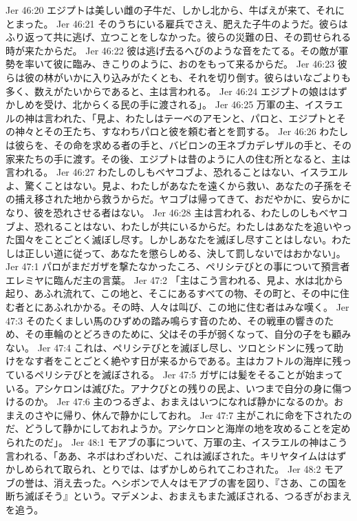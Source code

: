 Jer 46:20  エジプトは美しい雌の子牛だ、しかし北から、牛ばえが来て、それにとまった。
Jer 46:21  そのうちにいる雇兵でさえ、肥えた子牛のようだ。彼らはふり返って共に逃げ、立つことをしなかった。彼らの災難の日、その罰せられる時が来たからだ。
Jer 46:22  彼は逃げ去るへびのような音をたてる。その敵が軍勢を率いて彼に臨み、きこりのように、おのをもって来るからだ。
Jer 46:23  彼らは彼の林がいかに入り込みがたくとも、それを切り倒す。彼らはいなごよりも多く、数えがたいからであると、主は言われる。
Jer 46:24  エジプトの娘ははずかしめを受け、北からくる民の手に渡される」。
Jer 46:25  万軍の主、イスラエルの神は言われた、「見よ、わたしはテーベのアモンと、パロと、エジプトとその神々とその王たち、すなわちパロと彼を頼む者とを罰する。
Jer 46:26  わたしは彼らを、その命を求める者の手と、バビロンの王ネブカデレザルの手と、その家来たちの手に渡す。その後、エジプトは昔のように人の住む所となると、主は言われる。
Jer 46:27  わたしのしもべヤコブよ、恐れることはない、イスラエルよ、驚くことはない。見よ、わたしがあなたを遠くから救い、あなたの子孫をその捕え移された地から救うからだ。ヤコブは帰ってきて、おだやかに、安らかになり、彼を恐れさせる者はない。
Jer 46:28  主は言われる、わたしのしもべヤコブよ、恐れることはない、わたしが共にいるからだ。わたしはあなたを追いやった国々をことごとく滅ぼし尽す。しかしあなたを滅ぼし尽すことはしない。わたしは正しい道に従って、あなたを懲らしめる、決して罰しないではおかない」。
Jer 47:1  パロがまだガザを撃たなかったころ、ペリシテびとの事について預言者エレミヤに臨んだ主の言葉。
Jer 47:2  「主はこう言われる、見よ、水は北から起り、あふれ流れて、この地と、そこにあるすべての物、その町と、その中に住む者とにあふれかかる。その時、人々は叫び、この地に住む者はみな嘆く。
Jer 47:3  そのたくましい馬のひずめの踏み鳴らす音のため、その戦車の響きのため、その車輪のとどろきのために、父はその手が弱くなって、自分の子をも顧みない。
Jer 47:4  これは、ペリシテびとを滅ぼし尽し、ツロとシドンに残って助けをなす者をことごとく絶やす日が来るからである。主はカフトルの海岸に残っているペリシテびとを滅ぼされる。
Jer 47:5  ガザには髪をそることが始まっている。アシケロンは滅びた。アナクびとの残りの民よ、いつまで自分の身に傷つけるのか。
Jer 47:6  主のつるぎよ、おまえはいつになれば静かになるのか。おまえのさやに帰り、休んで静かにしておれ。
Jer 47:7  主がこれに命を下されたのだ、どうして静かにしておれようか。アシケロンと海岸の地を攻めることを定められたのだ」。
Jer 48:1  モアブの事について、万軍の主、イスラエルの神はこう言われる、「ああ、ネボはわざわいだ、これは滅ぼされた。キリヤタイムははずかしめられて取られ、とりでは、はずかしめられてこわされた。
Jer 48:2  モアブの誉は、消え去った。ヘシボンで人々はモアブの害を図り、『さあ、この国を断ち滅ぼそう』という。マデメンよ、おまえもまた滅ぼされる、つるぎがおまえを追う。
